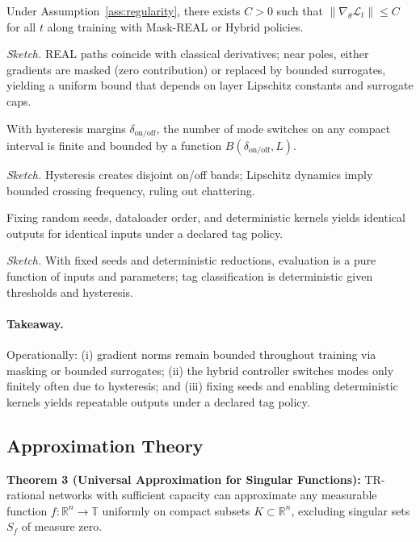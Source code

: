 \documentclass[twoside,11pt]{article}
\newcommand{\TR}{\mathbb{T}}
\newcommand{\RR}{\mathbb{R}}
\newcommand{\trReal}{\textsc{REAL}}
\newcommand{\TAGREAL}{\trReal}
\begin{document}
\begin{proposition}\label{prop:bounded}
Under Assumption~\ref{ass:regularity}, there exists $C>0$ such that $\|\nabla_\theta \mathcal{L}_t\|\le C$ for all $t$ along training with Mask-REAL or Hybrid policies.
\end{proposition}
\emph{Sketch.} \TAGREAL{} paths coincide with classical derivatives; near poles, either gradients are masked (zero contribution) or replaced by bounded surrogates, yielding a uniform bound that depends on layer Lipschitz constants and surrogate caps.

\begin{proposition}\label{prop:finite-switch}
With hysteresis margins $\delta_{\mathrm{on/off}}$, the number of mode switches on any compact interval is finite and bounded by a function $B(\delta_{\mathrm{on/off}},L)$.
\end{proposition}
\emph{Sketch.} Hysteresis creates disjoint on/off bands; Lipschitz dynamics imply bounded crossing frequency, ruling out chattering.

\begin{proposition}[Determinism]\label{prop:determinism}
Fixing random seeds, dataloader order, and deterministic kernels yields identical outputs for identical inputs under a declared tag policy.
\end{proposition}
\emph{Sketch.} With fixed seeds and deterministic reductions, evaluation is a pure function of inputs and parameters; tag classification is deterministic given thresholds and hysteresis.
\paragraph{Takeaway.} Operationally: (i) gradient norms remain bounded throughout training via masking or bounded surrogates; (ii) the hybrid controller switches modes only finitely often due to hysteresis; and (iii) fixing seeds and enabling deterministic kernels yields repeatable outputs under a declared tag policy.
\subsection{Approximation Theory}

\textbf{Theorem 3 (Universal Approximation for Singular Functions):} TR-rational networks with sufficient capacity can approximate any measurable function $f: \RR^n \to \TR$ uniformly on compact subsets $K \subset \RR^n$, excluding singular sets $S_f$ of measure zero.
\end{document}
